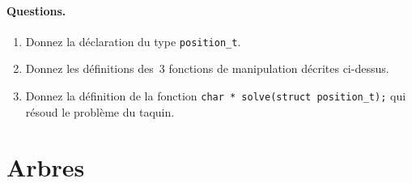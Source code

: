 \paragraph{Questions.}
\begin{enumerate}
\item Donnez la d\'eclaration du type \texttt{position\_t}.
\item Donnez les d\'efinitions des~$3$ fonctions de manipulation
  d\'ecrites ci-dessus.
\item Donnez la d\'efinition de la fonction %
  \verb?char * solve(struct position_t);? qui r\'esoud le probl\`eme
  du taquin.
\end{enumerate}
\section{Arbres}
\label{sec:Arbres}

